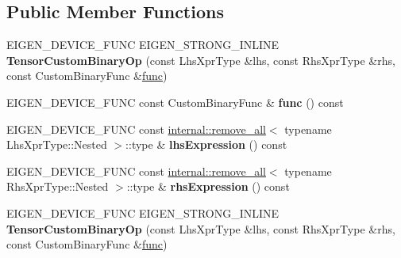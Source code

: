 \subsection*{Public Member Functions}
\begin{DoxyCompactItemize}
\item 
\mbox{\label{class_eigen_1_1_tensor_custom_binary_op_a66496d8d330b25042d4ccc7101c85861}} 
E\+I\+G\+E\+N\+\_\+\+D\+E\+V\+I\+C\+E\+\_\+\+F\+U\+NC E\+I\+G\+E\+N\+\_\+\+S\+T\+R\+O\+N\+G\+\_\+\+I\+N\+L\+I\+NE {\bfseries Tensor\+Custom\+Binary\+Op} (const Lhs\+Xpr\+Type \&lhs, const Rhs\+Xpr\+Type \&rhs, const Custom\+Binary\+Func \&\hyperlink{structfunc}{func})
\item 
\mbox{\label{class_eigen_1_1_tensor_custom_binary_op_abbe181c5f9b2ee2d61145eb9f80f0656}} 
E\+I\+G\+E\+N\+\_\+\+D\+E\+V\+I\+C\+E\+\_\+\+F\+U\+NC const Custom\+Binary\+Func \& {\bfseries func} () const
\item 
\mbox{\label{class_eigen_1_1_tensor_custom_binary_op_ab47190f09e2a7a0c2079d15a8d1a6adb}} 
E\+I\+G\+E\+N\+\_\+\+D\+E\+V\+I\+C\+E\+\_\+\+F\+U\+NC const \hyperlink{struct_eigen_1_1internal_1_1remove__all}{internal\+::remove\+\_\+all}$<$ typename Lhs\+Xpr\+Type\+::\+Nested $>$\+::type \& {\bfseries lhs\+Expression} () const
\item 
\mbox{\label{class_eigen_1_1_tensor_custom_binary_op_a793cd481b5c35f1b4f53fe34ee6151ed}} 
E\+I\+G\+E\+N\+\_\+\+D\+E\+V\+I\+C\+E\+\_\+\+F\+U\+NC const \hyperlink{struct_eigen_1_1internal_1_1remove__all}{internal\+::remove\+\_\+all}$<$ typename Rhs\+Xpr\+Type\+::\+Nested $>$\+::type \& {\bfseries rhs\+Expression} () const
\item 
\mbox{\label{class_eigen_1_1_tensor_custom_binary_op_a66496d8d330b25042d4ccc7101c85861}} 
E\+I\+G\+E\+N\+\_\+\+D\+E\+V\+I\+C\+E\+\_\+\+F\+U\+NC E\+I\+G\+E\+N\+\_\+\+S\+T\+R\+O\+N\+G\+\_\+\+I\+N\+L\+I\+NE {\bfseries Tensor\+Custom\+Binary\+Op} (const Lhs\+Xpr\+Type \&lhs, const Rhs\+Xpr\+Type \&rhs, const Custom\+Binary\+Func \&\hyperlink{structfunc}{func})
\item 
\mbox{\label{class_eigen_1_1_tensor_custom_binary_op_abbe181c5f9b2ee2d61145eb9f80f0656}} 

\end{DoxyCompactItemize}
